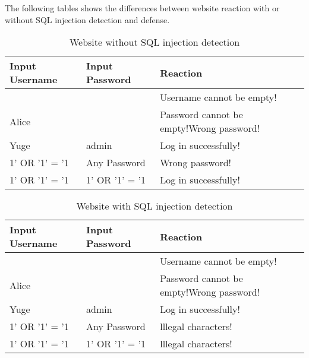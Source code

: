\documentclass[12pt]{article}
\begin{document}
The following tables shows the differences between website reaction with or without SQL injection detection and defense.

\begin{table}[htbp]
\centering
\caption{Website without SQL injection detection}
\begin{tabular}{ l l   p{9cm}  }
\hline
  Input Username & Input Password & Reaction \\
  \hline
   & & Username cannot be empty! \\
  Alice & &Password cannot be empty!Wrong password!  \\
  Yuge & admin & Log in successfully! \\
  1' OR '1' = '1 & Any Password & Wrong password! \\
  1' OR '1' = '1 & 1' OR '1' = '1 & Log in successfully! \\ 
    \hline
\end{tabular}
\end{table}

\begin{table}[htbp]
\centering
\caption{Website with SQL injection detection}
\begin{tabular}{ l l   p{9cm}  }
\hline
  Input Username & Input Password & Reaction \\
  \hline
   & & Username cannot be empty! \\
  Alice & &Password cannot be empty!Wrong password!  \\
  Yuge & admin & Log in successfully! \\
  1' OR '1' = '1 & Any Password & lllegal characters! \\
  1' OR '1' = '1 & 1' OR '1' = '1 & lllegal characters! \\ 
    \hline
\end{tabular}
\end{table}
\end{document}

